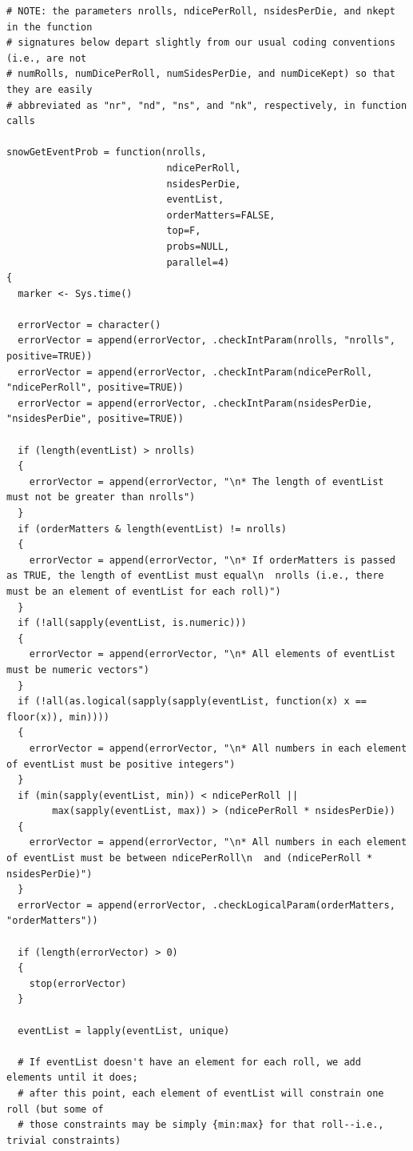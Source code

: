\documentclass[12pt]{article}
\begin{document}
\begin{lstlisting}
# NOTE: the parameters nrolls, ndicePerRoll, nsidesPerDie, and nkept in the function
# signatures below depart slightly from our usual coding conventions (i.e., are not 
# numRolls, numDicePerRoll, numSidesPerDie, and numDiceKept) so that they are easily 
# abbreviated as "nr", "nd", "ns", and "nk", respectively, in function calls

snowGetEventProb = function(nrolls,
                            ndicePerRoll,
                            nsidesPerDie,
                            eventList,
                            orderMatters=FALSE,
                            top=F,
                            probs=NULL,
                            parallel=4)
{
  marker <- Sys.time()
  
  errorVector = character()
  errorVector = append(errorVector, .checkIntParam(nrolls, "nrolls", positive=TRUE))
  errorVector = append(errorVector, .checkIntParam(ndicePerRoll, "ndicePerRoll", positive=TRUE))
  errorVector = append(errorVector, .checkIntParam(nsidesPerDie, "nsidesPerDie", positive=TRUE))
  
  if (length(eventList) > nrolls)
  {
    errorVector = append(errorVector, "\n* The length of eventList must not be greater than nrolls")
  }
  if (orderMatters & length(eventList) != nrolls)
  {
    errorVector = append(errorVector, "\n* If orderMatters is passed as TRUE, the length of eventList must equal\n  nrolls (i.e., there must be an element of eventList for each roll)")
  }
  if (!all(sapply(eventList, is.numeric)))
  {
    errorVector = append(errorVector, "\n* All elements of eventList must be numeric vectors")
  }
  if (!all(as.logical(sapply(sapply(eventList, function(x) x == floor(x)), min))))
  {
    errorVector = append(errorVector, "\n* All numbers in each element of eventList must be positive integers")
  }
  if (min(sapply(eventList, min)) < ndicePerRoll ||
        max(sapply(eventList, max)) > (ndicePerRoll * nsidesPerDie))
  {
    errorVector = append(errorVector, "\n* All numbers in each element of eventList must be between ndicePerRoll\n  and (ndicePerRoll * nsidesPerDie)")
  }
  errorVector = append(errorVector, .checkLogicalParam(orderMatters, "orderMatters"))
  
  if (length(errorVector) > 0)
  {
    stop(errorVector)
  }
  
  eventList = lapply(eventList, unique)
  
  # If eventList doesn't have an element for each roll, we add elements until it does;
  # after this point, each element of eventList will constrain one roll (but some of 
  # those constraints may be simply {min:max} for that roll--i.e., trivial constraints)
  

\end{lstlisting}
\end{document}
